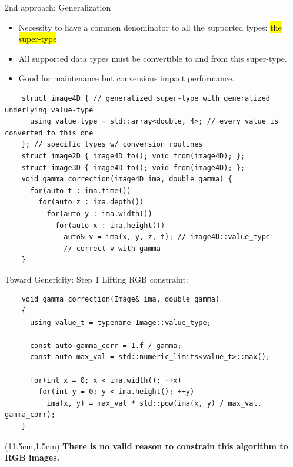 \documentclass[12pt,aspectratio=169]{beamer}
\makeatletter
\let\HL\hl
\renewcommand\hl{%
  \let\set@color\beamerorig@set@color
  \let\reset@color\beamerorig@reset@color
  \HL}
\makeatother
\begin{document}
\begin{frame}[fragile]{2nd approach: Generalization}
  \begin{itemize}
    \item Necessity to have a common denominator to all the supported types: \hl{the super-type}.
    \item All supported data types must be convertible to and from this super-type.
    \item Good for maintenance but conversions impact performance.
  \end{itemize}
  \begin{verbatim}
    struct image4D { // generalized super-type with generalized underlying value-type
      using value_type = std::array<double, 4>; // every value is converted to this one
    }; // specific types w/ conversion routines
    struct image2D { image4D to(); void from(image4D); };
    struct image3D { image4D to(); void from(image4D); };
    void gamma_correction(image4D ima, double gamma) {
      for(auto t : ima.time())
        for(auto z : ima.depth())
          for(auto y : ima.width())
            for(auto x : ima.height())
              auto& v = ima(x, y, z, t); // image4D::value_type
              // correct v with gamma
    }
  \end{verbatim}
\end{frame}

\begin{frame}[fragile]{Toward Genericity: Step 1}
  Lifting RGB constraint:
  \begin{verbatim}
    void gamma_correction(Image& ima, double gamma)
    {
      using value_t = typename Image::value_type;

      const auto gamma_corr = 1.f / gamma;
      const auto max_val = std::numeric_limits<value_t>::max();
    
      for(int x = 0; x < ima.width(); ++x)
        for(int y = 0; y < ima.height(); ++y)
          ima(x, y) = max_val * std::pow(ima(x, y) / max_val, gamma_corr);
    }
  \end{verbatim}
  \begin{textblock*}{4cm}(11.5cm,1.5cm)
    \textbf{There is no valid reason to constrain this algorithm to RGB images.}
  \end{textblock*}
\end{frame}
\end{document}
